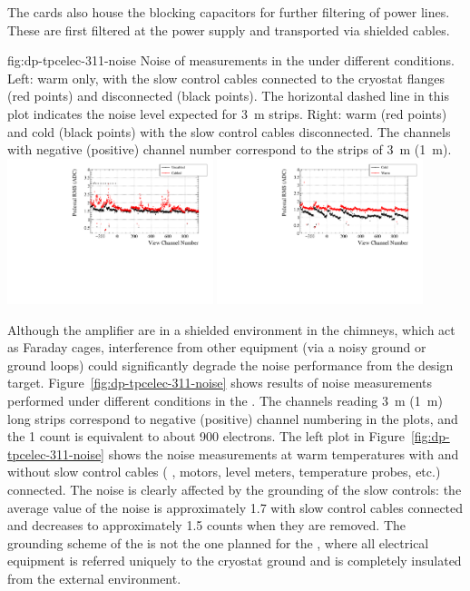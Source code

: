 The  cards also house the blocking capacitors for further filtering of  power lines. These are first filtered at the power supply and transported via shielded cables.


\begin{dunefigure}{fig:dp-tpcelec-311-noise}
{Noise of measurements in the  under different conditions. Left: warm only,  with the slow control cables connected to the cryostat flanges (red points) and disconnected (black points). The horizontal dashed line in this plot indicates the noise level expected for \SI{3}{\meter} strips. Right: warm (red points) and cold (black points) with the slow control cables disconnected. The channels with negative (positive) channel number correspond to the strips of \SI{3}{\meter} (\SI{1}{\meter}).}
\includegraphics[width=0.45\textwidth]{graphics/dp-tpcelec-311-noise-warm}
\includegraphics[width=0.45\textwidth]{graphics/dp-tpcelec-311-noise-warm-cold}
\end{dunefigure}


Although the  amplifier  are in a shielded environment in the chimneys, which act as Faraday cages, interference from other equipment (via a noisy ground or ground loops) could significantly degrade %
the noise performance from the design target. Figure~\ref{fig:dp-tpcelec-311-noise} shows results of noise measurements performed under different conditions in the . The channels reading \SI{3}{\meter} (\SI{1}{\metre}) long strips correspond to negative (positive) channel numbering in the plots, and the \num{1}  count is equivalent to about \num{900} electrons. The left plot in Figure~\ref{fig:dp-tpcelec-311-noise} shows the noise measurements at warm temperatures with and without slow control cables ( ,  motors, level meters, temperature probes, etc.) connected. The noise is clearly affected by the grounding of the slow controls: the average value of the noise  is approximately \num{1.7}  with slow control cables connected and decreases to approximately \num{1.5}  counts when they are removed. The grounding scheme of the  is not the one planned for the , where all electrical equipment is referred uniquely to the cryostat ground and is completely insulated from the external environment. 

